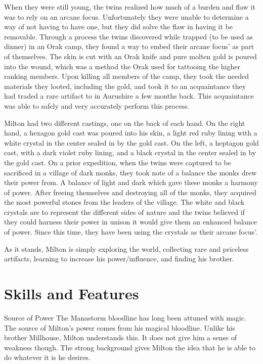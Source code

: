 \documentclass[letterpaper,10pt,twoside,twocolumn,openany]{book}
\begin{document}
When they were still young, the twins realized how much of a burden and flaw it was to rely on an arcane focus. Unfortunately they were unable to determine a way of not having to have one, but they did solve the flaw in having it be removable. Through a process the twins discovered while trapped (to be used as dinner) in an Orak camp, they found a way to embed their arcane focus' as part of themselves.  The skin is cut with an Orak knife and pure molten gold is poured into the wound, which was a method the Orak used for tattooing the higher ranking members. Upon killing all members of the camp, they took the needed materials they looted, including the gold, and took it to an acquaintance they had traded a rare artifact to in Aurushire a few months back. This acquaintance was able to safely and very accurately perform this process. 

Milton had two different castings, one on the back of each hand. On the right hand, a hexagon gold cast was poured into his skin, a light red ruby lining with a white crystal in the center sealed in by the gold cast. On the left, a heptagon gold cast, with a dark violet ruby lining, and a black crystal in the center sealed in by the gold cast. On a prior expedition, when the twins were captured to be sacrificed in a village of dark monks, they took note of a balance the monks drew their power from. A balance of light and dark which gave these monks a harmony of power. After freeing themselves and destroying all of the monks, they acquired the most powerful stones from the leaders of the village. The white and black crystals are to represent the different sides of nature and the twins believed if they could harness their power in unison it would give them an enhanced balance of power. Since this time, they have been using the crystals as their arcane focus'.

As it stands, Milton is simply exploring the world, collecting rare and priceless artifacts, learning to increase his power/influence, and finding his brother. 

\chapter{Skills and Features}

\begin{paperbox}[float=!t]{Source of Power}
	The Manastorm bloodline has long been attuned with magic. The source of Milton's power comes from his magical bloodline. Unlike his brother Millhouse, Milton understands this. It does not give him a sense of weakness though. The strong background gives Milton the idea that he is able to do whatever it is he desires.
\end{paperbox}
\end{document}
